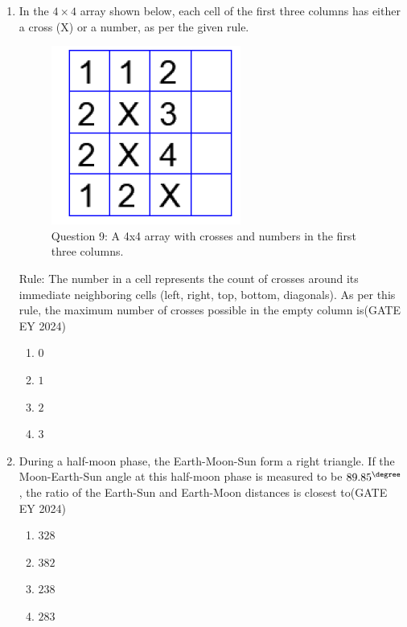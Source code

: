 \begin{enumerate}
\item In the $4 \times 4$ array shown below, each cell of the first three columns has either a cross (X) or a number, as per the given rule.
\begin{figure}[!ht]
    \centering
    \includegraphics[width=0.4\columnwidth]{figs/Q-9.png}
    \caption{Question 9: A 4x4 array with crosses and numbers in the first three columns.}
    \label{Q.9}
\end{figure}
Rule: The number in a cell represents the count of crosses around its immediate neighboring cells (left, right, top, bottom, diagonals). As per this rule, the maximum number of crosses possible in the empty column is\hfill{(GATE EY 2024)}
    \begin{multicols}{2}
    \begin{enumerate}
        \item $0$
        \item $1$
        \item $2$
        \item $3$
    \end{enumerate}
    \end{multicols}

\item During a half-moon phase, the Earth-Moon-Sun form a right triangle. If the Moon-Earth-Sun angle at this half-moon phase is measured to be $89.85^{\degree}$, the ratio of the Earth-Sun and Earth-Moon distances is closest to\hfill{(GATE EY 2024)}
    \begin{multicols}{2}
    \begin{enumerate}
        \item $328$
        \item $382$
        \item $238$
        \item $283$
    \end{enumerate}
    \end{multicols}

\end{enumerate}
\bigskip
{}
\clearpage

